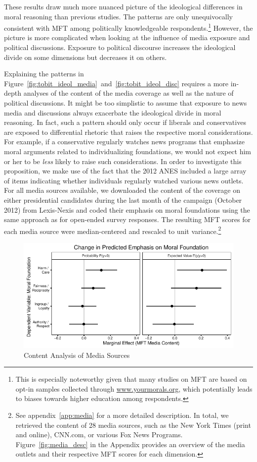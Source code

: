\documentclass[12pt]{article}
\begin{document}
These results draw much more nuanced picture of the ideological differences in moral reasoning than previous studies. The patterns are only unequivocally consistent with MFT among politically knowledgeable respondents.\footnote{This is especially noteworthy given that many studies on MFT are based on opt-in samples collected through \url{www.yourmorals.org}, which potentially leads to biases towards higher education among respondents.} However, the picture is more complicated when looking at the influence of media exposure and political discussions. Exposure to political discourse increases the ideological divide on some dimensions but decreases it on others.

Explaining the patterns in Figure~\ref{fig:tobit_ideol_media}~and~\ref{fig:tobit_ideol_disc} requires a more in-depth analyses of the content of the media coverage as well as the nature of political discussions. It might be too simplistic to assume that exposure to news media and discussions always exacerbate the ideological divide in moral reasoning. In fact, such a pattern should only occur if liberals and conservatives are exposed to differential rhetoric that raises the respective moral considerations. For example, if a conservative regularly watches news programs that emphasize moral arguments related to individualizing foundations, we would not expect him or her to be \textit{less} likely to raise such considerations. In order to investigate this proposition, we make use of the fact that the 2012 ANES included a large array of items indicating whether individuals regularly watched various news outlets. For all media sources available, we downloaded the content of the coverage on either presidential candidates during the last month of the campaign (October 2012) from Lexis-Nexis and coded their emphasis on moral foundations using the same approach as for open-ended survey responses. The resulting MFT scores for each media source were median-centered and rescaled to unit variance.\footnote{See appendix~\ref{app:media} for a more detailed description. In total, we retrieved the content of 28 media sources, such as the New York Times (print and online), CNN.com, or various Fox News Programs. Figure~\ref{fig:media_desc} in the Appendix provides an overview of the media outlets and their respective MFT scores for each dimension.} 

\begin{figure}[ht]\centering
\includegraphics{../calc/fig/tobit_media.pdf}
\caption{Content Analysis of Media Sources
}\label{fig:tobit_media}
\end{figure}
\end{document}
